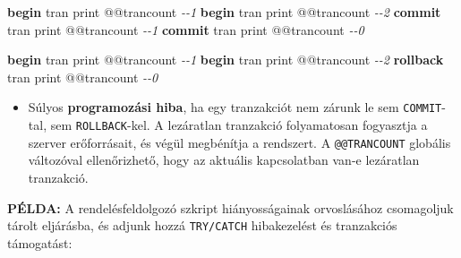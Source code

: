 \documentclass[
  magyar,
]{article}
\newenvironment{Shaded}{}{}
\newcommand{\CommentTok}[1]{\textcolor[rgb]{0.38,0.63,0.69}{\textit{#1}}}
\newcommand{\ControlFlowTok}[1]{\textcolor[rgb]{0.00,0.44,0.13}{\textbf{#1}}}
\newcommand{\KeywordTok}[1]{\textcolor[rgb]{0.00,0.44,0.13}{\textbf{#1}}}
\newcommand{\NormalTok}[1]{#1}
\providecommand{\tightlist}{%
  \setlength{\itemsep}{0pt}\setlength{\parskip}{0pt}}
\begin{document}
\begin{Shaded}
\begin{Highlighting}[]
\ControlFlowTok{begin}\NormalTok{ tran}
\NormalTok{    print @@trancount  }\CommentTok{{-}{-}1}
    \ControlFlowTok{begin}\NormalTok{ tran}
\NormalTok{        print @@trancount  }\CommentTok{{-}{-}2}
    \KeywordTok{commit}\NormalTok{ tran}
\NormalTok{    print @@trancount  }\CommentTok{{-}{-}1}
\KeywordTok{commit}\NormalTok{ tran}
\NormalTok{print @@trancount  }\CommentTok{{-}{-}0}

\ControlFlowTok{begin}\NormalTok{ tran}
\NormalTok{    print @@trancount  }\CommentTok{{-}{-}1}
    \ControlFlowTok{begin}\NormalTok{ tran}
\NormalTok{        print @@trancount  }\CommentTok{{-}{-}2}
\KeywordTok{rollback}\NormalTok{ tran}
\NormalTok{print @@trancount  }\CommentTok{{-}{-}0}
\end{Highlighting}
\end{Shaded}

\begin{itemize}
\tightlist
\item
  Súlyos \textbf{programozási hiba}, ha egy tranzakciót nem zárunk le
  sem \texttt{COMMIT}-tal, sem \texttt{ROLLBACK}-kel. A lezáratlan
  tranzakció folyamatosan fogyasztja a szerver erőforrásait, és végül
  megbénítja a rendszert. A \texttt{@@TRANCOUNT} globális változóval
  ellenőrizhető, hogy az aktuális kapcsolatban van-e lezáratlan
  tranzakció.
\end{itemize}

\textbf{PÉLDA:} A rendelésfeldolgozó szkript hiányosságainak
orvoslásához csomagoljuk tárolt eljárásba, és adjunk hozzá
\texttt{TRY/CATCH} hibakezelést és tranzakciós támogatást:
\end{document}
